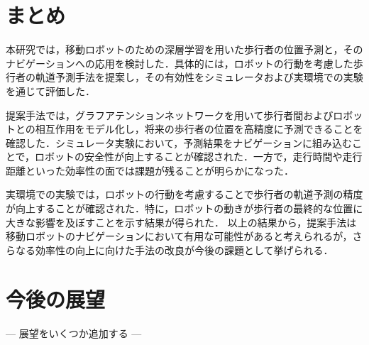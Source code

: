 
\section{まとめ}
本研究では，移動ロボットのための深層学習を用いた歩行者の位置予測と，そのナビゲーションへの応用を検討した．具体的には，ロボットの行動を考慮した歩行者の軌道予測手法を提案し，その有効性をシミュレータおよび実環境での実験を通じて評価した．

提案手法では，グラフアテンションネットワークを用いて歩行者間およびロボットとの相互作用をモデル化し，将来の歩行者の位置を高精度に予測できることを確認した．シミュレータ実験において，予測結果をナビゲーションに組み込むことで，ロボットの安全性が向上することが確認された．一方で，走行時間や走行距離といった効率性の面では課題が残ることが明らかになった．

実環境での実験では，ロボットの行動を考慮することで歩行者の軌道予測の精度が向上することが確認された．特に，ロボットの動きが歩行者の最終的な位置に大きな影響を及ぼすことを示す結果が得られた．
以上の結果から，提案手法は移動ロボットのナビゲーションにおいて有用な可能性があると考えられるが，さらなる効率性の向上に向けた手法の改良が今後の課題として挙げられる．

\section{今後の展望}

\begin{center}
  ---
  展望をいくつか追加する
  ---
\end{center}

\newpage